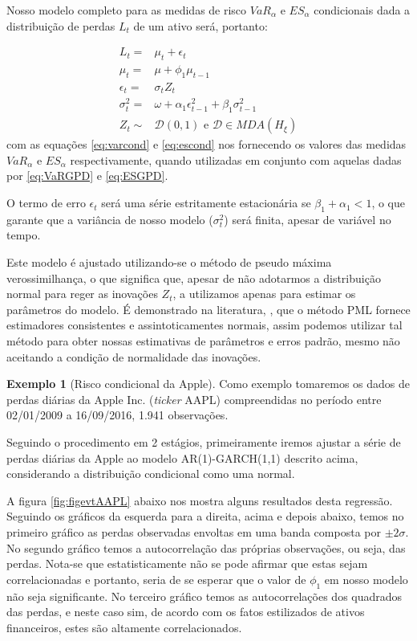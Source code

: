 \documentclass[review]{elsarticle}
\theoremstyle{definition}
\newtheorem{exemplo}[teor]{Exemplo}
\begin{document}
Nosso modelo completo para as medidas de risco $VaR_\alpha$ e $ES_\alpha$ condicionais dada a distribuição de perdas $L_t$ de um ativo será, portanto:

\begin{align}
L_t=&\mu_t+\epsilon_t \\
\mu_t=&\mu+\phi_1 \mu_{t-1} \label{eq:mut} \\
\epsilon_t=&\sigma_t Z_t\\
\sigma_t^2=&\omega+\alpha_1\epsilon_{t-1}^2+\beta_1 \sigma_{t-1}^2 \label{eq:sigma2} \\
Z_t\sim &\mathcal{D}(0,1) \text{ e } \mathcal{D} \in MDA(H_\xi)
\end{align}
com as equações \eqref{eq:varcond} e \eqref{eq:escond} nos fornecendo os valores das medidas $VaR_\alpha$ e $ES_\alpha$ respectivamente, quando utilizadas em conjunto com aquelas dadas por \eqref{eq:VaRGPD} e \eqref{eq:ESGPD}.

O termo de erro $\epsilon_t$ será uma série estritamente estacionária se $\beta_1+\alpha_1<1$, o que garante que a variância de nosso modelo ($\sigma_t^2$) será finita, apesar de variável no tempo.

Este modelo é ajustado utilizando-se o método de pseudo máxima verossimilhança, o que significa que, apesar de não adotarmos a distribuição normal para reger as inovações $Z_t$, a utilizamos apenas para estimar os parâmetros do modelo. É demonstrado na literatura, \cite[Capítulo 4]{Gourieroux1997}, que o método PML fornece estimadores consistentes e assintoticamentes normais, assim podemos utilizar tal método para obter nossas estimativas de parâmetros e erros padrão, mesmo não aceitando a condição de normalidade das inovações.

\begin{exemplo}[Risco condicional da Apple]
	\label{exe:appl}
	Como exemplo tomaremos os dados de perdas diárias da Apple Inc. (\emph{ticker} AAPL) compreendidas no período entre 02/01/2009 a 16/09/2016, 1.941 observações. 
\end{exemplo}

Seguindo o procedimento em 2 estágios, primeiramente iremos ajustar a série de perdas diárias da Apple ao modelo AR(1)-GARCH(1,1) descrito acima, considerando a distribuição condicional como uma normal. 

A figura \ref{fig:figevtAAPL} abaixo nos mostra alguns resultados desta regressão. Seguindo os gráficos da esquerda para a direita, acima e depois abaixo, temos no primeiro gráfico as perdas observadas envoltas em uma banda composta por $\pm 2\sigma$. No segundo gráfico temos a autocorrelação das próprias observações, ou seja, das perdas. Nota-se que estatisticamente não se pode afirmar que estas sejam correlacionadas e portanto, seria de se esperar que o valor de $\phi_1$ em nosso modelo não seja significante. No terceiro gráfico temos as autocorrelações dos quadrados das perdas, e neste caso sim, de acordo com os fatos estilizados de ativos financeiros, estes são altamente correlacionados.
\end{document}
